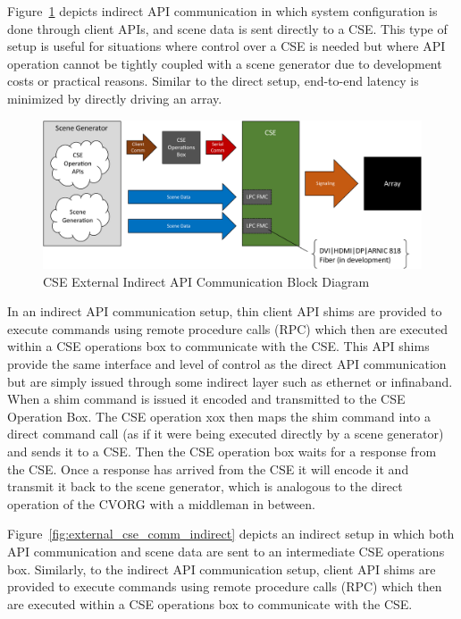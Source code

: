     Figure~\ref{fig:external_cse_comm_half_indirect} depicts indirect API communication in which system configuration is done through client APIs, and scene data is sent directly to a CSE. This type of setup is useful for situations where control over a CSE is needed but where API operation cannot be tightly coupled with a scene generator due to development costs or practical reasons. Similar to the direct setup, end-to-end latency is minimized by directly driving an array.

    \begin{figure}
        \centering
        \includegraphics[width=1.0\textwidth]{fig/external_cse_comm_half_indirect.pdf}
        \caption{CSE External Indirect API Communication Block Diagram}
        \label{fig:external_cse_comm_half_indirect}
    \end{figure}

    In an indirect API communication setup, thin client API shims are provided to execute commands using remote procedure calls (RPC) which then are executed within a CSE operations box to communicate with the CSE. This API shims provide the same interface and level of control as the direct API communication but are simply issued through some indirect layer such as ethernet or infinaband. When a shim command is issued it encoded and transmitted to the CSE Operation Box. The CSE operation xox then maps the shim command into a direct command call (as if it were being executed directly by a scene generator) and sends it to a CSE. Then the CSE operation box waits for a response from the CSE. Once a response has arrived from the CSE it will encode it and transmit it back to the scene generator, which is analogous to the direct operation of the CVORG with a middleman in between.

    Figure~\ref{fig:external_cse_comm_indirect} depicts an indirect setup in which both API communication and scene data are sent to an intermediate CSE operations box. Similarly, to the indirect API communication setup, client API shims are provided to execute commands using remote procedure calls (RPC) which then are executed within a CSE operations box to communicate with the CSE.

